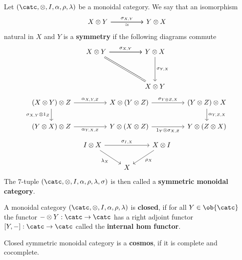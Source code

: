 \begin{definition}
    Let $(\catc, \otimes,I, \alpha, \rho, \lambda)$ be a monoidal category. We say that an isomorphism 
    \[\begin{tikzcd}
	{X\otimes Y} && {Y\otimes X}
	\arrow["{\sigma_{X,Y}}", from=1-1, to=1-3]
	\arrow["\simeq"', from=1-1, to=1-3]
\end{tikzcd}\]
    natural in $X$ and $Y$ is a \textbf{symmetry} if the following diagrams commute
    \[
    \begin{tikzcd}
	{X\otimes Y} && {Y\otimes X} \\
	\\
	&& {X\otimes Y}
	\arrow["{\sigma_{X,Y}}", from=1-1, to=1-3]
	\arrow[from=1-1, to=1-3]
	\arrow[Rightarrow, no head, from=1-1, to=3-3]
	\arrow["{\sigma_{Y,X}}", from=1-3, to=3-3]
    \end{tikzcd}
    \]
    \[\begin{tikzcd}
	{(X\otimes Y)\otimes Z} && {X\otimes(Y\otimes Z)} && {(Y\otimes Z)\otimes X} \\
	{(Y\otimes X)\otimes Z} && {Y\otimes(X\otimes Z)} && {Y\otimes (Z\otimes X)}
	\arrow["{\alpha_{X,Y,Z}}", from=1-1, to=1-3]
	\arrow["{\sigma_{X,Y}\otimes 1_Z}"', from=1-1, to=2-1]
	\arrow["{\sigma_{Y\otimes Z, X}}", from=1-3, to=1-5]
	\arrow["{\alpha_{Y,Z,X}}", from=1-5, to=2-5]
	\arrow["{\alpha_{Y,X,Z}}"', from=2-1, to=2-3]
	\arrow["{1_Y\otimes \sigma_{X,Z}}"', from=2-3, to=2-5]
    \end{tikzcd}
\]
\[
    \begin{tikzcd}
        {I\otimes X} && {X\otimes I} \\
        & X
        \arrow["{\sigma_{I,X}}", from=1-1, to=1-3]
        \arrow["{\lambda_X}"', from=1-1, to=2-2]
        \arrow["{\rho_X}", from=1-3, to=2-2]
    \end{tikzcd}
\]
    The $7$-tuple $(\catc, \otimes,I, \alpha, \rho, \lambda, \sigma)$ is then called a \textbf{symmetric monoidal category}.
\end{definition}
\begin{definition}
    A monoidal category $(\catc, \otimes,I, \alpha, \rho, \lambda)$ is \textbf{closed}, if for all $Y\in\ob{\catc}$ 
    the functor $-\otimes Y : \catc \to \catc$ has a right adjoint functor $[Y,-]:\catc\to\catc$ called the \textbf{internal hom functor}.
\end{definition}
\begin{definition}
    Closed symmetric monoidal category is a \textbf{cosmos}, if it is complete and cocomplete.
\end{definition}
